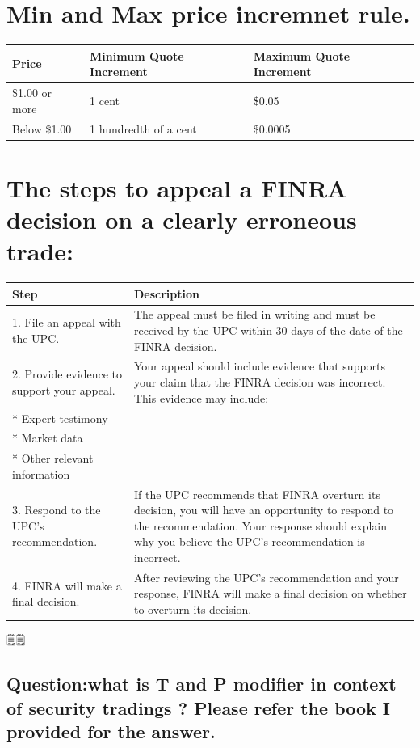 \documentclass[11pt]{article}
\begin{document}
\section{Min and Max price incremnet rule.}
\label{sec:org7038652}
\begin{center}
\begin{tabular}{lll}
Price & Minimum Quote Increment & Maximum Quote Increment\\[0pt]
\hline
\$1.00 or more & 1 cent & \$0.05\\[0pt]
Below \$1.00 & 1 hundredth of a cent & \$0.0005\\[0pt]
\end{tabular}
\end{center}

\section{The steps to appeal a FINRA decision on a clearly erroneous trade:}
\label{sec:org0e12d07}

\begin{center}
\begin{tabular}{ll}
Step & Description\\[0pt]
\hline
1. File an appeal with the UPC. & The appeal must be filed in writing and must be received by the UPC within 30 days of the date of the FINRA decision.\\[0pt]
2. Provide evidence to support your appeal. & Your appeal should include evidence that supports your claim that the FINRA decision was incorrect. This evidence may include:\\[0pt]
* Expert testimony & \\[0pt]
* Market data & \\[0pt]
* Other relevant information & \\[0pt]
3. Respond to the UPC's recommendation. & If the UPC recommends that FINRA overturn its decision, you will have an opportunity to respond to the recommendation. Your response should explain why you believe the UPC's recommendation is incorrect.\\[0pt]
4. FINRA will make a final decision. & After reviewing the UPC's recommendation and your response, FINRA will make a final decision on whether to overturn its decision.\\[0pt]
\end{tabular}
\end{center}
🗒🗒️️


\subsection{Question:what is T and P modifier in context of security tradings ? Please refer the book I provided for the answer.}
\label{sec:orga93afb4}
\end{document}
